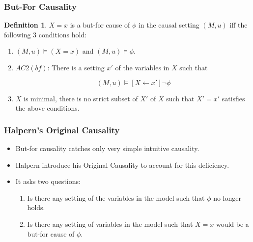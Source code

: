 \documentclass{beamer}
\theoremstyle{plain}
\theoremstyle{definition}
\newtheorem{defn}[thm]{Definition} %
\begin{document}
\begin{frame}
\frametitle{But-For Causality}

\begin{defn}$X=x$ is a but-for cause of $\phi$ in the causal setting $(M,u)$ iff the following 3 conditions hold:
\begin{enumerate}
\item $(M,u) \models (X=x)$ and $(M,u) \models \phi$.
\item $AC2(bf)$: There is a setting $x'$ of the variables in $X$ such that

\[
(M,u) \models [X\leftarrow x']\lnot \phi
\] 

\item $X$ is minimal, there is no strict subset of $X'$ of $X$ such that $X' = x'$ satisfies the above conditions.
\end{enumerate}

\end{defn}

\end{frame}





\begin{frame}
\frametitle{Halpern's Original Causality}
\begin{itemize}
\item But-for causality catches only very simple intuitive causality.
\item Halpern introduce his Original Causality to account for this deficiency.
\item It asks two questions:
\begin{enumerate}
\item Is there any setting of the variables in the model such that $\phi$ no longer holds.
\item Is there any setting of variables in the model such that $X=x$ would be a but-for cause of $\phi$.
\end{enumerate}
\end{itemize}

\end{frame}
\end{document}
